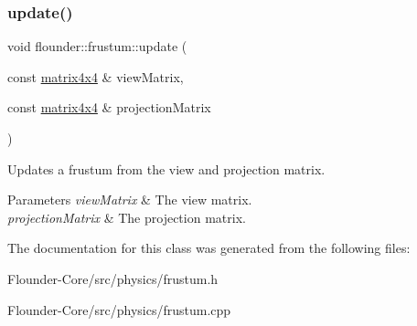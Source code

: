\subsubsection{\texorpdfstring{update()}{update()}}
{\footnotesize\ttfamily void flounder\+::frustum\+::update (\begin{DoxyParamCaption}\item[{const \hyperlink{classflounder_1_1matrix4x4}{matrix4x4} \&}]{view\+Matrix,  }\item[{const \hyperlink{classflounder_1_1matrix4x4}{matrix4x4} \&}]{projection\+Matrix }\end{DoxyParamCaption})}



Updates a frustum from the view and projection matrix. 


\begin{DoxyParams}{Parameters}
{\em view\+Matrix} & The view matrix. \\
\hline
{\em projection\+Matrix} & The projection matrix. \\
\hline
\end{DoxyParams}


The documentation for this class was generated from the following files\+:\begin{DoxyCompactItemize}
\item 
Flounder-\/\+Core/src/physics/frustum.\+h\item 
Flounder-\/\+Core/src/physics/frustum.\+cpp\end{DoxyCompactItemize}

